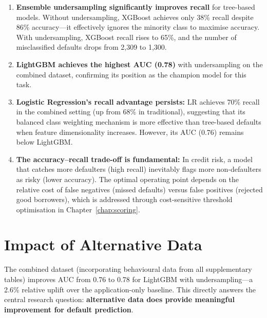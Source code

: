 \begin{enumerate}
    \item \textbf{Ensemble undersampling significantly improves recall} for tree-based models. Without undersampling, XGBoost achieves only 38\% recall despite 86\% accuracy---it effectively ignores the minority class to maximise accuracy. With undersampling, XGBoost recall rises to 65\%, and the number of misclassified defaults drops from 2,309 to 1,300.
    \item \textbf{LightGBM achieves the highest AUC (0.78)} with undersampling on the combined dataset, confirming its position as the champion model for this task.
    \item \textbf{Logistic Regression's recall advantage persists:} LR achieves 70\% recall in the combined setting (up from 68\% in traditional), suggesting that its balanced class weighting mechanism is more effective than tree-based defaults when feature dimensionality increases. However, its AUC (0.76) remains below LightGBM.
    \item \textbf{The accuracy--recall trade-off is fundamental:} In credit risk, a model that catches more defaulters (high recall) inevitably flags more non-defaulters as risky (lower accuracy). The optimal operating point depends on the relative cost of false negatives (missed defaults) versus false positives (rejected good borrowers), which is addressed through cost-sensitive threshold optimisation in Chapter~\ref{chap:scoring}.
\end{enumerate}

\section{Impact of Alternative Data}
\label{sec:alt_data_impact}

The combined dataset (incorporating behavioural data from all supplementary tables) improves AUC from 0.76 to 0.78 for LightGBM with undersampling---a 2.6\% relative uplift over the application-only baseline. This directly answers the central research question: \textbf{alternative data does provide meaningful improvement for default prediction}.

